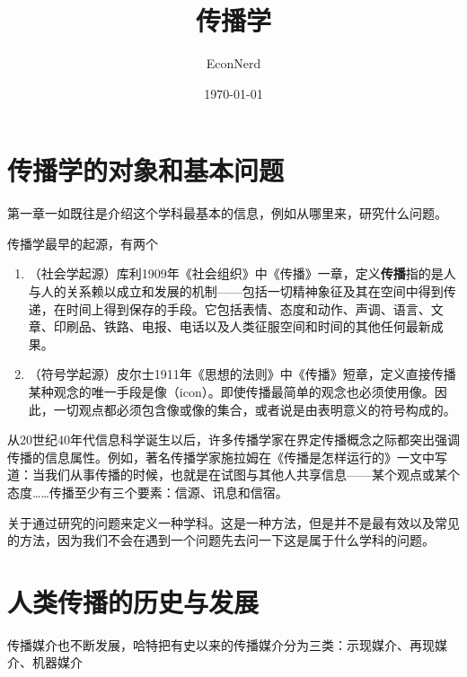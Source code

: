 \documentclass[UTF8,12pt]{ctexart}
\title{传播学} %
\author{EconNerd}
\date{\today}
\numberwithin{equation}{section} %
\numberwithin{figure}{section}
\numberwithin{table}{section}
\begin{document}
	\maketitle
	\tableofcontents
	\newpage
	
	\section{传播学的对象和基本问题}
	第一章一如既往是介绍这个学科最基本的信息，例如从哪里来，研究什么问题。
	
	传播学最早的起源，有两个
	\begin{enumerate}
		\item （社会学起源）库利1909年《社会组织》中《传播》一章，定义\textbf{传播}指的是人与人的关系赖以成立和发展的机制——包括一切精神象征及其在空间中得到传递，在时间上得到保存的手段。它包括表情、态度和动作、声调、语言、文章、印刷品、铁路、电报、电话以及人类征服空间和时间的其他任何最新成果。
		
		\item （符号学起源）皮尔士1911年《思想的法则》中《传播》短章，定义直接传播某种观念的唯一手段是像（icon）。即使传播最简单的观念也必须使用像。因此，一切观点都必须包含像或像的集合，或者说是由表明意义的符号构成的。
	\end{enumerate}
	
	从20世纪40年代信息科学诞生以后，许多传播学家在界定传播概念之际都突出强调传播的信息属性。例如，著名传播学家施拉姆在《传播是怎样运行的》一文中写道：当我们从事传播的时候，也就是在试图与其他人共享信息——某个观点或某个态度……传播至少有三个要素：信源、讯息和信宿。
	
	关于通过研究的问题来定义一种学科。这是一种方法，但是并不是最有效以及常见的方法，因为我们不会在遇到一个问题先去问一下这是属于什么学科的问题。
	
	\section{人类传播的历史与发展}
	传播媒介也不断发展，哈特把有史以来的传播媒介分为三类：示现媒介、再现媒介、机器媒介

	
\end{document}
